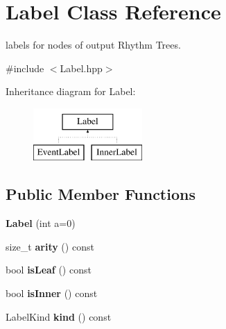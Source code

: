 \hypertarget{classLabel}{}\section{Label Class Reference}
\label{classLabel}


labels for nodes of output Rhythm Trees.  




{\ttfamily \#include $<$Label.\+hpp$>$}

Inheritance diagram for Label\+:\begin{figure}[H]
\begin{center}
\leavevmode
\includegraphics[height=2.000000cm]{classLabel}
\end{center}
\end{figure}
\subsection*{Public Member Functions}
\begin{DoxyCompactItemize}
\item 
{\bfseries Label} (int a=0)
\item 
size\+\_\+t {\bfseries arity} () const
\item 
\mbox{\label{classLabel_aece2f72aeab3b5e59371d270acd66ef7}} 
bool {\bfseries is\+Leaf} () const
\item 
\mbox{\label{classLabel_ae6629ed1895cbb2a95cdf284cbd18cdd}} 
bool {\bfseries is\+Inner} () const
\item 
\mbox{\label{classLabel_a46339b9942fe44345634652e245807b0}} 
Label\+Kind {\bfseries kind} () const
\end{DoxyCompactItemize}
